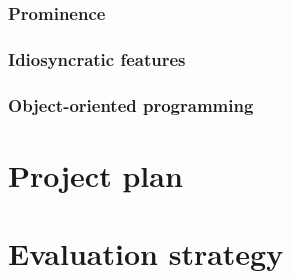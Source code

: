 \documentclass[a4paper,11pt,titlepage]{report}
\begin{document}
\subsection{Prominence}
\subsection{Idiosyncratic features}
\subsection{Object-oriented programming}

\chapter{Project plan}
\chapter{Evaluation strategy}



\end{document}
